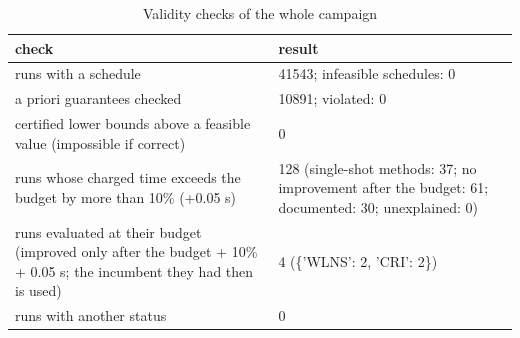 \begin{table}[htbp]
\centering
\small
\caption{Validity checks of the whole campaign}
\label{tab:validity_summary}
\begin{tabular}{ll}
\toprule
check & result \\
\midrule
runs with a schedule & 41543; infeasible schedules: 0 \\
a priori guarantees checked & 10891; violated: 0 \\
certified lower bounds above a feasible value (impossible if correct) & 0 \\
runs whose charged time exceeds the budget by more than 10\% (+0.05 s) & 128 (single-shot methods: 37; no improvement after the budget: 61; documented: 30; unexplained: 0) \\
runs evaluated at their budget (improved only after the budget + 10\% + 0.05 s; the incumbent they had then is used) & 4 (\{'WLNS': 2, 'CRI': 2\}) \\
runs with another status & 0 \\
\bottomrule
\end{tabular}
\end{table}
